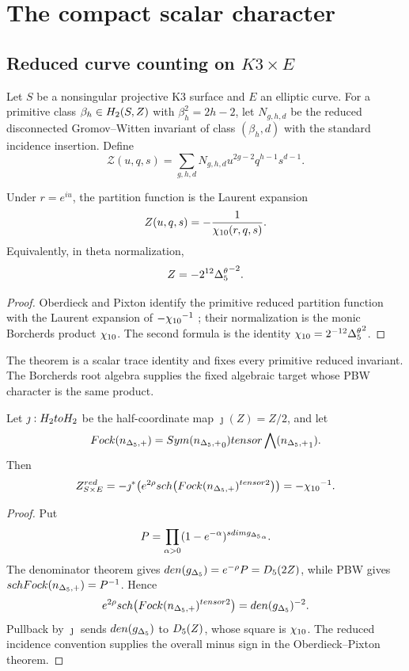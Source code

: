 \part{The compact scalar character}

\chapter{Reduced curve counting on \texorpdfstring{$K3\times E$}{K3 x E}}
Let $S$ be a nonsingular projective K3 surface and $E$ an elliptic curve. For a primitive class $\beta_h\in H_2(S,Z)$ with $\beta_h^2=2h-2$, let $N_{g,h,d}$ be the reduced disconnected Gromov--Witten invariant of class $(\beta_h,d)$ with the standard incidence insertion. Define
\[
 \mathcal Z(u,q,s)=
 \sum_{g,h,d}N_{g,h,d}u^{2g-2}q^{h-1}s^{d-1}.
\]

\begin{theorem}
Under $r=e^{iu}$, the partition function is the Laurent expansion
\[
 Z(u,q,s)=-\frac1{{\chi_{10}}(r,q,s)}.
\]
Equivalently, in theta normalization,
\[
 Z=-2^{12}{\Delta^{\theta}_5}^{-2}.
\]
\end{theorem}
\begin{proof}
Oberdieck and Pixton identify the primitive reduced partition function with the Laurent expansion of $-{\chi_{10}}^{-1}$ \cite{OP}; their normalization is the monic Borcherds product ${\chi_{10}}$. The second formula is the identity ${\chi_{10}}=2^{-12}{\Delta^{\theta}_5}^2$.
\end{proof}

The theorem is a scalar trace identity and fixes every primitive reduced invariant.  The Borcherds root algebra supplies the fixed algebraic target whose PBW character is the same product.

\begin{corollary}
Let $\jmath:H_2toH_2$ be the half-coordinate map $\jmath(Z)=Z/2$, and let
\[
 Fock({n_{\Delta_5,+}})=
 Sym({n_{\Delta_5,+}}_{0})tensor\bigwedge({n_{\Delta_5,+}}_{1}).
\]
Then
\[
 Z^{red}_{S\times E}
 =-\jmath^*\!\left(
 e^{2\rho}sch\bigl(Fock({n_{\Delta_5,+}})^{tensor2}\bigr)
 \right)
 =-{\chi_{10}}^{-1}.
\]
\end{corollary}
\begin{proof}
Put
\[
 P=\prod_{\alpha>0}(1-e^{-\alpha})^{sdim{g_{\Delta_5}}_\alpha}.
\]
The denominator theorem gives $den({g_{\Delta_5}})=e^{-\rho}P={D_5}(2Z)$, while PBW gives $schFock({n_{\Delta_5,+}})=P^{-1}$.  Hence
\[
 e^{2\rho}sch\bigl(Fock({n_{\Delta_5,+}})^{tensor2}\bigr)
 =den({g_{\Delta_5}})^{-2}.
\]
Pullback by $\jmath$ sends $den({g_{\Delta_5}})$ to ${D_5}(Z)$, whose square is ${\chi_{10}}$.  The reduced incidence convention supplies the overall minus sign in the Oberdieck--Pixton theorem.
\end{proof}

